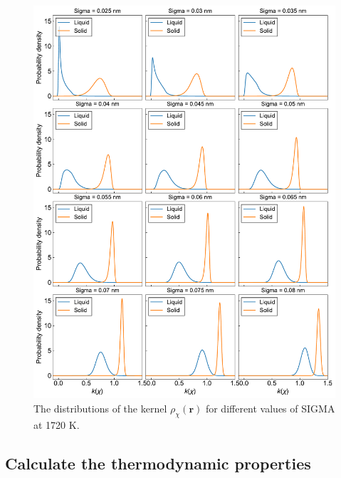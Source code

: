 \documentclass{article}
\begin{document}
\begin{figure}[p]
    \centering
    \includegraphics[width=\textwidth]{./plot/histo.pdf}
    \caption{The distributions of the kernel $\rho_\chi(\mathbf{r})$ for different values of SIGMA at 1720 K.}
\end{figure}

\subsection{Calculate the thermodynamic properties}
\end{document}
